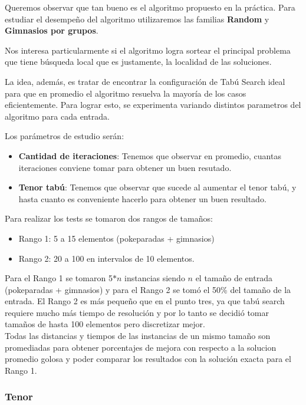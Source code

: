 Queremos observar que tan bueno es el algoritmo propuesto en la práctica.
Para estudiar el desempeño del algoritmo utilizaremos las familias \textbf{Random} y \textbf{Gimnasios por grupos}. 

Nos interesa particularmente si el algoritmo logra sortear el principal problema que tiene búsqueda local que es justamente, la localidad de las soluciones.

La idea, además, es tratar de encontrar la configuración de Tabú Search ideal para que en promedio el algoritmo resuelva la mayoría de los casos eficientemente. Para lograr esto, se experimenta variando distintos parametros del algoritmo para cada entrada.

Los parámetros de estudio serán:

\begin{itemize}
\item  \textbf{Cantidad de iteraciones}: Tenemos que observar en promedio, cuantas iteraciones conviene tomar para obtener un buen resutado.
\item \textbf{Tenor tabú}: Tenemos que observar que sucede al aumentar el tenor tabú, y hasta cuanto es conveniente hacerlo para obtener un buen resultado.
\end{itemize}

Para realizar los tests se tomaron dos rangos de tamaños:

\begin{itemize}
\item Rango 1: 5 a 15 elementos (pokeparadas + gimnasios)
\item Rango 2: 20 a 100 en intervalos de 10 elementos.
\end{itemize}

Para el Rango 1 se tomaron 5$\ast n$ instancias siendo $n$ el tamaño de entrada (pokeparadas + gimnasios) y para el Rango 2 se tomó el 50\% del tamaño de la entrada. El Rango 2 es más pequeño que en el punto tres, ya que tabú search requiere mucho más tiempo de resolución y por lo tanto se decidió tomar tamaños de hasta 100 elementos pero discretizar mejor.\\

Todas las distancias y tiempos de las instancias de un mismo tamaño son promediadas para obtener porcentajes de mejora con respecto a la solucion promedio golosa y poder comparar los resultados con la solución exacta para el Rango 1.\\

\subsubsection*{Tenor}

